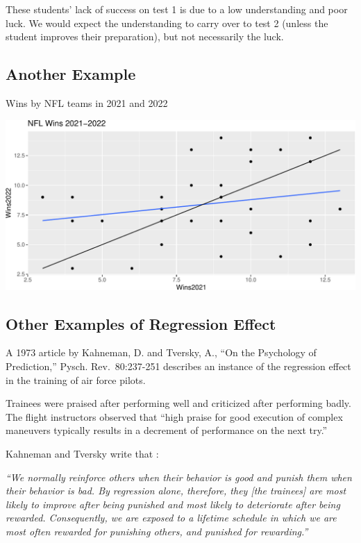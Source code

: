 \documentclass[
  letterpaper,
  DIV=11,
  numbers=noendperiod]{scrreprt}
\begin{document}
These students' lack of success on test 1 is due to a low understanding
and poor luck. We would expect the understanding to carry over to test 2
(unless the student improves their preparation), but not necessarily the
luck.

\subsection{Another Example}\label{another-example}

Wins by NFL teams in 2021 and 2022

\includegraphics{Ch4_files/figure-pdf/unnamed-chunk-93-1.pdf}

\subsection{Other Examples of Regression
Effect}\label{other-examples-of-regression-effect}

A 1973 article by Kahneman, D. and Tversky, A., ``On the Psychology of
Prediction,'' Pysch. Rev.~80:237-251 describes an instance of the
regression effect in the training of air force pilots.

Trainees were praised after performing well and criticized after
performing badly. The flight instructors observed that ``high praise for
good execution of complex maneuvers typically results in a decrement of
performance on the next try.''

Kahneman and Tversky write that :

\emph{``We normally reinforce others when their behavior is good and
punish them when their behavior is bad. By regression alone, therefore,
they {[}the trainees{]} are most likely to improve after being punished
and most likely to deteriorate after being rewarded. Consequently, we
are exposed to a lifetime schedule in which we are most often rewarded
for punishing others, and punished for rewarding.''}
\end{document}
